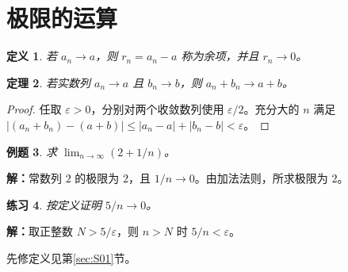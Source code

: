 \documentclass[UTF8,fontset=fandol,11pt]{ctexart}
\newtheorem{definition}{定义}[section]
\newtheorem{theorem}[definition]{定理}
\newtheorem{example}[definition]{例题}
\newtheorem{exercise}[definition]{练习}
\begin{document}
\section{极限的运算}\label{sec:S02}
\begin{definition}
若 $a_n\to a$，则 $r_n=a_n-a$ 称为余项，并且 $r_n\to0$。
\end{definition}
\begin{theorem}
\label{thm:later}若实数列 $a_n\to a$ 且 $b_n\to b$，则 $a_n+b_n\to a+b$。
\end{theorem}
\begin{proof}
任取 $\varepsilon>0$，分别对两个收敛数列使用 $\varepsilon/2$。充分大的 $n$ 满足 $|(a_n+b_n)-(a+b)|\leq |a_n-a|+|b_n-b|<\varepsilon$。
\end{proof}
\begin{example}
求 $\lim_{n\to\infty}(2+1/n)$。
\end{example}
\par\noindent\textbf{解：}常数列 $2$ 的极限为 $2$，且 $1/n\to0$。由加法法则，所求极限为 $2$。\par
\begin{exercise}
按定义证明 $5/n\to0$。
\end{exercise}
\par\noindent\textbf{解：}取正整数 $N>5/\varepsilon$，则 $n>N$ 时 $5/n<\varepsilon$。\par
先修定义见第\ref{sec:S01}节。\par
\end{document}
